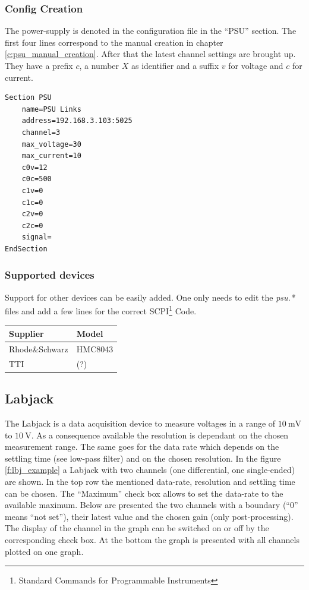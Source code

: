 \documentclass[10pt,a4paper]{article}
\begin{document}
	\subsubsection{Config Creation}
	
	The power-supply is denoted in the configuration file in the \enquote{PSU} section. The first four lines correspond to the manual creation in chapter \ref{c:psu_manual_creation}. After that the latest channel settings are brought up. They have a prefix $c$, a number $X$ as identifier and a suffix $v$ for voltage and $c$ for current.
	
\begin{lstlisting}[caption=PSU Config]
Section PSU
	name=PSU Links
	address=192.168.3.103:5025
	channel=3
	max_voltage=30
	max_current=10
	c0v=12
	c0c=500
	c1v=0
	c1c=0
	c2v=0
	c2c=0
	signal=
EndSection
\end{lstlisting}
	
		\subsubsection{Supported devices}
		Support for other devices can be easily added. One only needs to edit the \textit{psu.*} files and add a few lines for the correct SCPI\footnote{Standard Commands for Programmable Instruments} Code.
	
		\begin{table}[H]
		\centering
		\begin{tabular}{ll}
		\toprule
		Supplier			& Model \\ \midrule
		Rhode\&Schwarz		& HMC8043 \\
		TTI					& (?) \\
		\bottomrule
		\end{tabular}			
		\end{table}	
		
\newpage
	
	\subsection{Labjack}
	The Labjack is a data acquisition device to measure voltages in a range of $\SI{10}{\milli\volt}$ to $\SI{10}{\volt}$. As a consequence available the resolution is dependant on the chosen measurement range. The same goes for the data rate which depends on the settling time (see low-pass filter) and on the chosen resolution. In the figure \eqref{f:lbj_example} a Labjack with two channels (one differential, one single-ended) are shown. In the top row the mentioned data-rate, resolution and settling time can be chosen. The \enquote{Maximum} check box allows to set the data-rate to the available maximum. Below are presented the two channels with a boundary (\enquote{0} means \enquote{not set}), their latest value and the chosen gain (only post-processing). The display of the channel in the graph can be switched on or off by the corresponding check box. At the bottom the graph is presented with all channels plotted on one graph.
	
\end{document}
